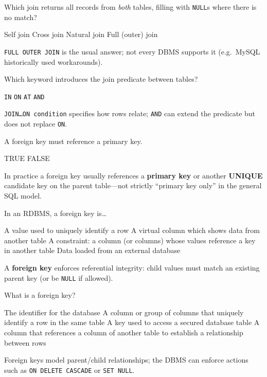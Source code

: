 \question[4]
Which join returns all records from \emph{both} tables, filling with \texttt{NULL}s where there is no match?
\begin{choices}
  \choice Self join
  \choice Cross join
  \choice Natural join
  \CorrectChoice Full (outer) join
\end{choices}
\begin{solution}
  \texttt{FULL OUTER JOIN} is the usual answer; not every DBMS supports it (e.g.\ MySQL historically used workarounds).
\end{solution}

\question[4]
Which keyword introduces the join predicate between tables?
\begin{choices}
  \choice \lstinline[style=sqlinline]!IN!
  \CorrectChoice \lstinline[style=sqlinline]!ON!
  \choice \lstinline[style=sqlinline]!AT!
  \choice \lstinline[style=sqlinline]!AND!
\end{choices}
\begin{solution}
  \texttt{JOIN\ldots ON condition} specifies how rows relate; \texttt{AND} can extend the predicate but does not replace \texttt{ON}.
\end{solution}

\newpage

\question[4]
A foreign key must reference a primary key.
\begin{choices}
  \choice TRUE
  \CorrectChoice FALSE
\end{choices}
\begin{solution}
  In practice a foreign key usually references a \textbf{primary key} or another \textbf{UNIQUE} candidate key on the parent table---not strictly ``primary key only'' in the general SQL model.
\end{solution}

\question[4]
In an RDBMS, a foreign key is\ldots
\begin{choices}
  \choice A value used to uniquely identify a row
  \choice A virtual column which shows data from another table
  \CorrectChoice A constraint: a column (or columns) whose values reference a key in another table
  \choice Data loaded from an external database
\end{choices}
\begin{solution}
  A \textbf{foreign key} enforces referential integrity: child values must match an existing parent key (or be \texttt{NULL} if allowed).
\end{solution}

\question[4]
What is a foreign key?
\begin{choices}
  \choice The identifier for the database
  \choice A column or group of columns that uniquely identify a row in the same table
  \choice A key used to access a secured database table
  \CorrectChoice A column that references a column of another table to establish a relationship between rows
\end{choices}
\begin{solution}
  Foreign keys model parent/child relationships; the DBMS can enforce actions such as \texttt{ON DELETE CASCADE} or \texttt{SET NULL}.
\end{solution}

